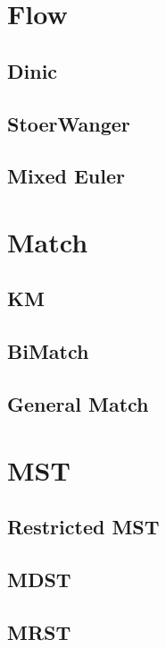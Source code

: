 \documentclass[10pt,twocolumn,oneside]{article}
\begin{document}
\section{Flow}
\subsection{Dinic}
\subsection{StoerWanger}
\subsection{Mixed Euler}

\section{Match}
\subsection{KM}
\subsection{BiMatch}
\subsection{General Match}

\section{MST}
\subsection{Restricted MST}
\subsection{MDST}
\subsection{MRST}
\end{document}
